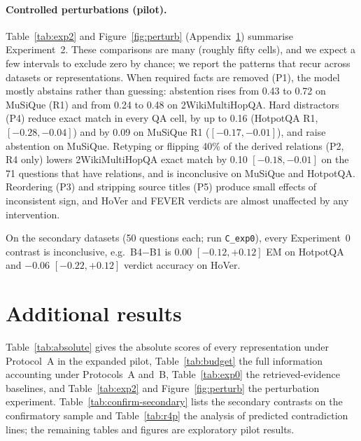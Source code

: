 \paragraph{Controlled perturbations (pilot).}

Table~\ref{tab:exp2} and Figure~\ref{fig:perturb} (Appendix~\ref{app:tables}) summarise Experiment~2. These comparisons are many (roughly fifty cells), and we expect a few intervals to exclude zero by chance; we report the patterns that recur across datasets or representations. When required facts are removed (P1), the model mostly abstains rather than guessing: abstention rises from 0.43 to 0.72 on MuSiQue (R1) and from 0.24 to 0.48 on 2WikiMultiHopQA. Hard distractors (P4) reduce exact match in every QA cell, by up to 0.16 (HotpotQA R1, $[-0.28, -0.04]$) and by 0.09 on MuSiQue R1 ($[-0.17, -0.01]$), and raise abstention on MuSiQue. Retyping or flipping 40\% of the derived relations (P2, R4 only) lowers 2WikiMultiHopQA exact match by 0.10 $[-0.18, -0.01]$ on the 71 questions that have relations, and is inconclusive on MuSiQue and HotpotQA. Reordering (P3) and stripping source titles (P5) produce small effects of inconsistent sign, and HoVer and FEVER verdicts are almost unaffected by any intervention.



On the secondary datasets (50 questions each; run \texttt{C\_exp0}), every Experiment~0 contrast is inconclusive, e.g.\ B4$-$B1 is $0.00$ $[-0.12, +0.12]$ EM on HotpotQA and $-0.06$ $[-0.22, +0.12]$ verdict accuracy on HoVer.

\section{Additional results}
\label{app:tables}

Table~\ref{tab:absolute} gives the absolute scores of every representation under Protocol~A in the expanded pilot, Table~\ref{tab:budget} the full information accounting under Protocols~A and~B, Table~\ref{tab:exp0} the retrieved-evidence baselines, and Table~\ref{tab:exp2} and Figure~\ref{fig:perturb} the perturbation experiment. Table~\ref{tab:confirm-secondary} lists the secondary contrasts on the confirmatory sample and Table~\ref{tab:r4p} the analysis of predicted contradiction lines; the remaining tables and figures are exploratory pilot results.

